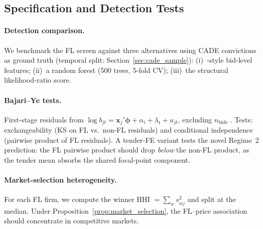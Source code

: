
\subsection{Specification and Detection Tests}
\label{sec:additional_tests}

\paragraph{Detection comparison.}
\label{sec:detection_validation}
We benchmark the FL screen against three alternatives using CADE
convictions as ground truth (temporal split:
Section~\ref{sec:cade_sample}): (i)~\citet{imhof2019detecting}-style
bid-level features; (ii)~a random forest (500 trees, 5-fold CV);
(iii)~the structural likelihood-ratio score.

\paragraph{Bajari--Ye tests.}
\label{sec:bajari_ye}
First-stage residuals from
$\log b_{jt} = \mathbf{x}_j'\boldsymbol{\phi} + \alpha_i +
\lambda_t + u_{jt}$, excluding $n_{\text{bids}}$
\citep[jointly determined;][p.~978]{bajari2003deciding}.
Tests: exchangeability (KS on FL vs.\ non-FL residuals) and
conditional independence (pairwise product of FL residuals). A
tender-FE variant tests the novel Regime~2 prediction: the FL
pairwise product should drop \emph{below} the non-FL product, as
the tender mean absorbs the shared focal-point component.

\paragraph{Market-selection heterogeneity.}
\label{sec:empirical_network}
For each FL firm, we compute the winner HHI
$= \sum_{w} s_{wj}^2$ and split at the median. Under
Proposition~\ref{prop:market_selection}, the FL--price association
should concentrate in competitive markets.
